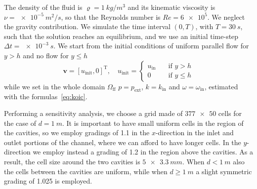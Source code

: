 The density of the fluid is $\varrho = \SI{1}{kg/m^3}$ and its kinematic 
viscosity is $\nu=\SI{e-5}{m^2/s}$, so that the Reynolds number is 
$Re=\num{6e5}$. We neglect the gravity contribution.
We simulate the time interval $(0, T)$, with $T=\SI{30}{s}$, such that the solution reaches an equilibrium, and we use an initial time-step $\Delta t = \SI{e-3}{s}$. We start from the initial 
conditions of uniform parallel flow for $y>h$ and no flow for $y\leq h$
\begin{equation}
	\mathbf{v} = [u_\text{init},0]^\mathrm{T}, \quad u_\text{init} =
	\begin{cases}
	u_\text{in} \quad&\text{if $y>h$}\\
	0 \quad&\text{if $y\leq h$}
	\end{cases}
\end{equation}
while we set in the whole domain $\Omega_\text{ff}$ $p=p_\text{ext}$, $k=k_\text{in}$ and $\omega=\omega_\text{in}$, estimated with the formulas~\eqref{eq:koic}.

Performing a sensitivity analysis, we choose a grid made of $\num{377x50}$ cells for the case of $d=\SI{1}{m}$. It is important to have small uniform cells in the region of the cavities, so we employ gradings of 1.1 in the $x$-direction in the inlet and outlet portions of the channel, where we can afford to have longer cells. In the $y$-direction we employ instead a grading of 1.2 in the region above the cavities. As a result, the cell size around the two cavities is $\SI{5x3.3}{mm}$. When $d<\SI{1}{m}$ also the cells between the cavities are uniform, while when $d\geq \SI{1}{m}$ a slight symmetric grading of 1.025 is employed.

